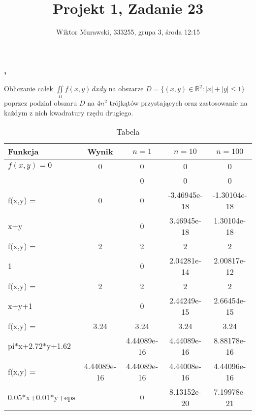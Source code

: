\documentclass[9pt]{beamer}
\title{Projekt 1, Zadanie 23}
\author{Wiktor Murawski, 333255, grupa 3, środa 12:15}
\date{}
\begin{document}
    \begin{frame}
        \frametitle{\insertauthor,\space\inserttitle}
        \begin{spacing}{2}
        Obliczanie całek $ \iint\limits_D f(x,y) \, dxdy $ na obszarze
        $  D = \{(x,y) \in \mathbb{R}^2 : |x| + |y| \leq 1\} $
        poprzez podział obszaru $ D $ na $ 4n^2 $ trójkątów przystających oraz
        zastosowanie na każdym z nich kwadratury rzędu drugiego.
        \end{spacing}
    \end{frame}

    \begin{frame}
        \vspace{-1cm}
        \begin{table}[H]
            \caption{Tabela}
            \label{tab:tabela}
            \begin{tabular}{|l|c|c|c|c|}
                \hline
                Funkcja & Wynik & $n=1$ & $n=10$ & $n=100$ \\
                \hline
                $f(x,y) = 0 $ & 0 & 0 & 0 & 0 \\
                &  & 0 & 0 & 0 \\
                \hline
                f(x,y) = & 0 & 0 & -3.46945e-18 & -1.30104e-18 \\
                x+y &  & 0 & 3.46945e-18 & 1.30104e-18 \\
                \hline
                f(x,y) = & 2 & 2 & 2 & 2 \\
                1 &  & 0 & 2.04281e-14 & 2.00817e-12 \\
                \hline
                f(x,y) = & 2 & 2 & 2 & 2 \\
                x+y+1 &  & 0 & 2.44249e-15 & 2.66454e-15 \\
                \hline
                f(x,y) = & 3.24 & 3.24 & 3.24 & 3.24 \\
                pi*x+2.72*y+1.62 &  & 4.44089e-16 & 4.44089e-16 & 8.88178e-16 \\
                \hline
                f(x,y) = & 4.44089e-16 & 4.44089e-16 & 4.44008e-16 & 4.44096e-16 \\
                0.05*x+0.01*y+eps &  & 0 & 8.13152e-20 & 7.19978e-21 \\
                \hline
            \end{tabular}

        \end{table}
        \hfill
    \end{frame}
\end{document}
